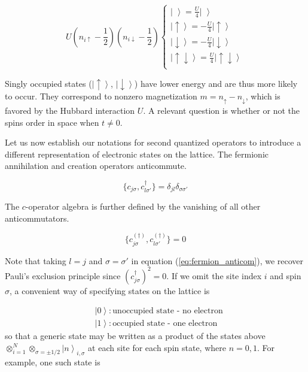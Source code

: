 \documentclass[10pt, twocolumn, twoside]{article}
\begin{document}
\begin{equation}
U (n_{i\uparrow} - \frac{1}{2} ) ( n_{i\downarrow} - \frac{1}{2} ) 
\begin{cases}
\left| \,\, \right\rangle = \frac{U}{4} \left| \,\, \right\rangle \\
\left|\uparrow \right\rangle = -\frac{U}{4} \left|\uparrow \right\rangle \\
\left|\downarrow\right \rangle = -\frac{U}{4} \left|\downarrow\right \rangle \\
\left|\uparrow \downarrow \right\rangle = \frac{U}{4} \left|\uparrow \downarrow \right\rangle \\
\end{cases}
\end{equation}

Singly occupied states ($\left|\uparrow \right\rangle$, $\left|\downarrow\right \rangle$) have lower energy and are thus more likely to occur. They correspond to nonzero magnetization $m = n_{\uparrow} - n_{\downarrow}$, which is favored by the Hubbard interaction $U$. A relevant question is whether or not the spins order in space when $t \neq 0$.

Let us now establish our notations for second quantized operators to introduce a different representation of electronic states on the lattice. The fermionic annihilation and creation operators anticommute.

\begin{equation}
\{ c_{j\sigma} , c_{l \sigma'}^\dagger \} = \delta_{jl} \delta_{\sigma\sigma'}
\end{equation}

The $c$-operator algebra is further defined by the vanishing of all other anticommutators.

\begin{equation}\label{eq:fermion_anticom}
\{ c_{j\sigma}^{(\dagger)} , c_{l \sigma'}^{(\dagger)} \} = 0
\end{equation}

Note that taking $l = j$ and $\sigma = \sigma'$ in equation (\ref{eq:fermion_anticom}), we recover Pauli's exclusion principle since $(c_{j\sigma}^\dagger)^2 = 0$. If we omit the site index $i$ and spin $\sigma$, a convenient way of specifying states on the lattice is

\begin{equation}
\begin{split}
&\left| 0 \right\rangle : \text{unoccupied state - no electron} \\
&\left| 1 \right\rangle : \text{occupied state - one electron}
\end{split}
\end{equation}
so that a generic state may be written as a product of the states above $\otimes_{i=1}^N \otimes_{\sigma = \pm 1/2} \left| n \right\rangle_{i, \sigma}$ at each site for each spin state, where $n= 0, 1$. For example, one such state is
\end{document}
